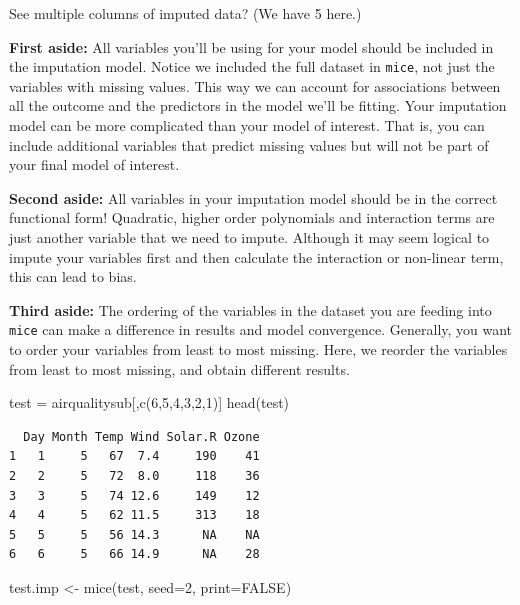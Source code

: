 \documentclass[
  letterpaper,
  DIV=11,
  numbers=noendperiod]{scrreprt}
\newenvironment{Shaded}{}{}
\newcommand{\AttributeTok}[1]{\textcolor[rgb]{0.49,0.56,0.16}{#1}}
\newcommand{\ConstantTok}[1]{\textcolor[rgb]{0.53,0.00,0.00}{#1}}
\newcommand{\DecValTok}[1]{\textcolor[rgb]{0.25,0.63,0.44}{#1}}
\newcommand{\FunctionTok}[1]{\textcolor[rgb]{0.02,0.16,0.49}{#1}}
\newcommand{\NormalTok}[1]{#1}
\newcommand{\OtherTok}[1]{\textcolor[rgb]{0.00,0.44,0.13}{#1}}
\begin{document}
See multiple columns of imputed data? (We have 5 here.)

\textbf{First aside:} All variables you'll be using for your model
should be included in the imputation model. Notice we included the full
dataset in \texttt{mice}, not just the variables with missing values.
This way we can account for associations between all the outcome and the
predictors in the model we'll be fitting. Your imputation model can be
more complicated than your model of interest. That is, you can include
additional variables that predict missing values but will not be part of
your final model of interest.

\textbf{Second aside:} All variables in your imputation model should be
in the correct functional form! Quadratic, higher order polynomials and
interaction terms are just another variable that we need to impute.
Although it may seem logical to impute your variables first and then
calculate the interaction or non-linear term, this can lead to bias.

\textbf{Third aside:} The ordering of the variables in the dataset you
are feeding into \texttt{mice} can make a difference in results and
model convergence. Generally, you want to order your variables from
least to most missing. Here, we reorder the variables from least to most
missing, and obtain different results.

\begin{Shaded}
\begin{Highlighting}[]
\NormalTok{  test }\OtherTok{=}\NormalTok{ airqualitysub[,}\FunctionTok{c}\NormalTok{(}\DecValTok{6}\NormalTok{,}\DecValTok{5}\NormalTok{,}\DecValTok{4}\NormalTok{,}\DecValTok{3}\NormalTok{,}\DecValTok{2}\NormalTok{,}\DecValTok{1}\NormalTok{)]}
  \FunctionTok{head}\NormalTok{(test)}
\end{Highlighting}
\end{Shaded}

\begin{verbatim}
  Day Month Temp Wind Solar.R Ozone
1   1     5   67  7.4     190    41
2   2     5   72  8.0     118    36
3   3     5   74 12.6     149    12
4   4     5   62 11.5     313    18
5   5     5   56 14.3      NA    NA
6   6     5   66 14.9      NA    28
\end{verbatim}

\begin{Shaded}
\begin{Highlighting}[]
\NormalTok{  test.imp }\OtherTok{\textless{}{-}} \FunctionTok{mice}\NormalTok{(test, }\AttributeTok{seed=}\DecValTok{2}\NormalTok{, }\AttributeTok{print=}\ConstantTok{FALSE}\NormalTok{)}
\end{Highlighting}
\end{Shaded}
\end{document}
